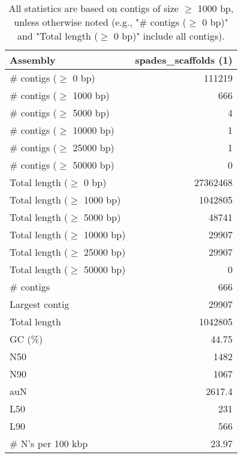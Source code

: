 \documentclass[12pt,a4paper]{article}
\begin{document}
\begin{table}[ht]
\begin{center}
\caption{All statistics are based on contigs of size $\geq$ 1000 bp, unless otherwise noted (e.g., "\# contigs ($\geq$ 0 bp)" and "Total length ($\geq$ 0 bp)" include all contigs).}
\begin{tabular}{|l*{1}{|r}|}
\hline
Assembly & spades\_scaffolds (1) \\ \hline
\# contigs ($\geq$ 0 bp) & 111219 \\ \hline
\# contigs ($\geq$ 1000 bp) & 666 \\ \hline
\# contigs ($\geq$ 5000 bp) & 4 \\ \hline
\# contigs ($\geq$ 10000 bp) & 1 \\ \hline
\# contigs ($\geq$ 25000 bp) & 1 \\ \hline
\# contigs ($\geq$ 50000 bp) & 0 \\ \hline
Total length ($\geq$ 0 bp) & 27362468 \\ \hline
Total length ($\geq$ 1000 bp) & 1042805 \\ \hline
Total length ($\geq$ 5000 bp) & 48741 \\ \hline
Total length ($\geq$ 10000 bp) & 29907 \\ \hline
Total length ($\geq$ 25000 bp) & 29907 \\ \hline
Total length ($\geq$ 50000 bp) & 0 \\ \hline
\# contigs & 666 \\ \hline
Largest contig & 29907 \\ \hline
Total length & 1042805 \\ \hline
GC (\%) & 44.75 \\ \hline
N50 & 1482 \\ \hline
N90 & 1067 \\ \hline
auN & 2617.4 \\ \hline
L50 & 231 \\ \hline
L90 & 566 \\ \hline
\# N's per 100 kbp & 23.97 \\ \hline
\end{tabular}
\end{center}
\end{table}
\end{document}
